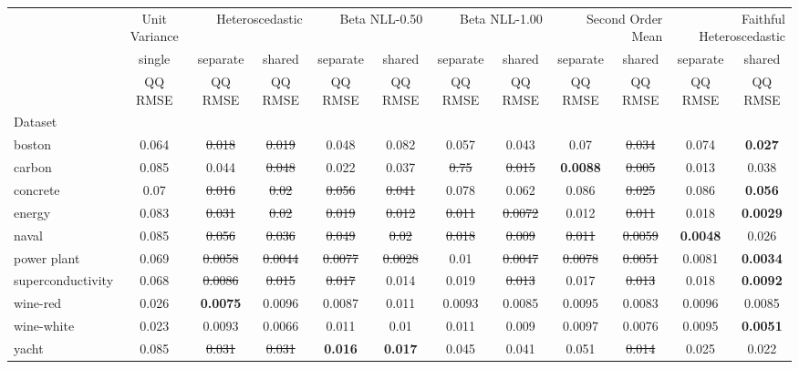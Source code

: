 \begin{tabular}{l|c|cc|cc|cc|cc|cc}
\toprule
{} & {Unit Variance} & \multicolumn{2}{r}{Heteroscedastic} & \multicolumn{2}{r}{Beta NLL-0.50} & \multicolumn{2}{r}{Beta NLL-1.00} & \multicolumn{2}{r}{Second Order Mean} & \multicolumn{2}{r}{Faithful Heteroscedastic} \\
{} & {single} & {separate} & {shared} & {separate} & {shared} & {separate} & {shared} & {separate} & {shared} & {separate} & {shared} \\
{} & {QQ RMSE} & {QQ RMSE} & {QQ RMSE} & {QQ RMSE} & {QQ RMSE} & {QQ RMSE} & {QQ RMSE} & {QQ RMSE} & {QQ RMSE} & {QQ RMSE} & {QQ RMSE} \\
{Dataset} & {} & {} & {} & {} & {} & {} & {} & {} & {} & {} & {} \\
\midrule
boston & 0.064 & \sout{0.018} & \sout{0.019} & 0.048 & 0.082 & 0.057 & 0.043 & 0.07 & \sout{0.034} & 0.074 & \textbf{0.027} \\
carbon & 0.085 & 0.044 & \sout{0.048} & 0.022 & 0.037 & \sout{0.75} & \sout{0.015} & \textbf{0.0088} & \sout{0.005} & 0.013 & 0.038 \\
concrete & 0.07 & \sout{0.016} & \sout{0.02} & \sout{0.056} & \sout{0.041} & 0.078 & 0.062 & 0.086 & \sout{0.025} & 0.086 & \textbf{0.056} \\
energy & 0.083 & \sout{0.031} & \sout{0.02} & \sout{0.019} & \sout{0.012} & \sout{0.011} & \sout{0.0072} & 0.012 & \sout{0.011} & 0.018 & \textbf{0.0029} \\
naval & 0.085 & \sout{0.056} & \sout{0.036} & \sout{0.049} & \sout{0.02} & \sout{0.018} & \sout{0.009} & \sout{0.011} & \sout{0.0059} & \textbf{0.0048} & 0.026 \\
power plant & 0.069 & \sout{0.0058} & \sout{0.0044} & \sout{0.0077} & \sout{0.0028} & 0.01 & \sout{0.0047} & \sout{0.0078} & \sout{0.0051} & 0.0081 & \textbf{0.0034} \\
superconductivity & 0.068 & \sout{0.0086} & \sout{0.015} & \sout{0.017} & 0.014 & 0.019 & \sout{0.013} & 0.017 & \sout{0.013} & 0.018 & \textbf{0.0092} \\
wine-red & 0.026 & \textbf{0.0075} & 0.0096 & 0.0087 & 0.011 & 0.0093 & 0.0085 & 0.0095 & 0.0083 & 0.0096 & 0.0085 \\
wine-white & 0.023 & 0.0093 & 0.0066 & 0.011 & 0.01 & 0.011 & 0.009 & 0.0097 & 0.0076 & 0.0095 & \textbf{0.0051} \\
yacht & 0.085 & \sout{0.031} & \sout{0.031} & \textbf{0.016} & \textbf{0.017} & 0.045 & 0.041 & 0.051 & \sout{0.014} & 0.025 & 0.022 \\
\bottomrule
\end{tabular}
